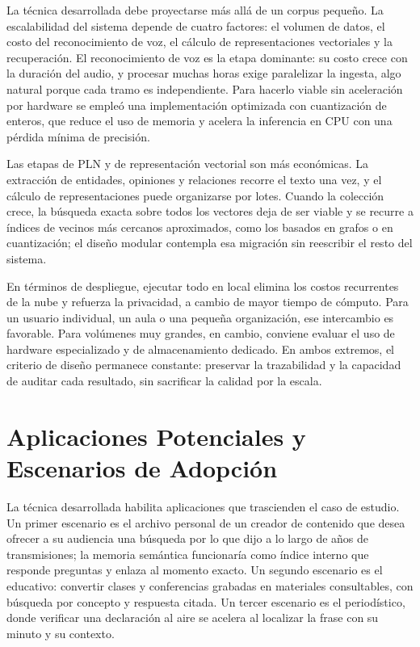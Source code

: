 \documentclass[12pt,a4paper]{article}
\begin{document}
La técnica desarrollada debe proyectarse más allá de un corpus pequeño. La escalabilidad del sistema depende de cuatro factores: el volumen de datos, el costo del reconocimiento de voz, el cálculo de representaciones vectoriales y la recuperación. El reconocimiento de voz es la etapa dominante: su costo crece con la duración del audio, y procesar muchas horas exige paralelizar la ingesta, algo natural porque cada tramo es independiente. Para hacerlo viable sin aceleración por hardware se empleó una implementación optimizada con cuantización de enteros, que reduce el uso de memoria y acelera la inferencia en CPU con una pérdida mínima de precisión.

Las etapas de PLN y de representación vectorial son más económicas. La extracción de entidades, opiniones y relaciones recorre el texto una vez, y el cálculo de representaciones puede organizarse por lotes. Cuando la colección crece, la búsqueda exacta sobre todos los vectores deja de ser viable y se recurre a índices de vecinos más cercanos aproximados, como los basados en grafos o en cuantización; el diseño modular contempla esa migración sin reescribir el resto del sistema.

En términos de despliegue, ejecutar todo en local elimina los costos recurrentes de la nube y refuerza la privacidad, a cambio de mayor tiempo de cómputo. Para un usuario individual, un aula o una pequeña organización, ese intercambio es favorable. Para volúmenes muy grandes, en cambio, conviene evaluar el uso de hardware especializado y de almacenamiento dedicado. En ambos extremos, el criterio de diseño permanece constante: preservar la trazabilidad y la capacidad de auditar cada resultado, sin sacrificar la calidad por la escala.



\section{Aplicaciones Potenciales y Escenarios de Adopción}
\label{sec:aplicaciones}

La técnica desarrollada habilita aplicaciones que trascienden el caso de estudio. Un primer escenario es el archivo personal de un creador de contenido que desea ofrecer a su audiencia una búsqueda por lo que dijo a lo largo de años de transmisiones; la memoria semántica funcionaría como índice interno que responde preguntas y enlaza al momento exacto. Un segundo escenario es el educativo: convertir clases y conferencias grabadas en materiales consultables, con búsqueda por concepto y respuesta citada. Un tercer escenario es el periodístico, donde verificar una declaración al aire se acelera al localizar la frase con su minuto y su contexto.
\end{document}
